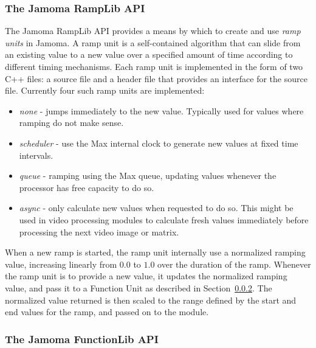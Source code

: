 \documentclass{sig-alternate}
\begin{document}
\subsubsection{The Jamoma RampLib API} %
\label{ssub:the_ramp_lib}

The Jamoma RampLib API provides a means by which to create and use \emph{ramp units} in Jamoma.  A ramp unit is a self-contained algorithm that can slide from an existing value to a new value over a specified amount of time according to different timing mechanisms. Each ramp unit is implemented in the form of two C++ files: a source file and a header file that provides an interface for the source file. Currently four such ramp units are implemented:

\begin{itemize}

	\item \emph{none} - jumps immediately to the new value. Typically used for values where ramping do not make sense.

	\item \emph{scheduler} - use the Max internal clock to generate new values at fixed time intervals.

	\item \emph{queue} - ramping using the Max queue, updating values whenever the processor has free capacity to do so.

	\item \emph{async} - only calculate new values when requested to do so. This might be used in video processing modules to calculate fresh values immediately before processing the next video image or matrix.
	
\end{itemize}

When a new ramp is started, the ramp unit internally use a normalized ramping value, increasing linearly from $0.0$ to $1.0$ over the duration of the ramp. Whenever the ramp unit is to provide a new value, it updates the normalized ramping value, and pass it to a Function Unit as described in Section~\ref{ssub:the_function_lib}. The normalized value returned is then scaled to the range defined by the start and end values for the ramp, and passed on to the module.



\subsubsection{The Jamoma FunctionLib API} %
\label{ssub:the_function_lib}
\end{document}
